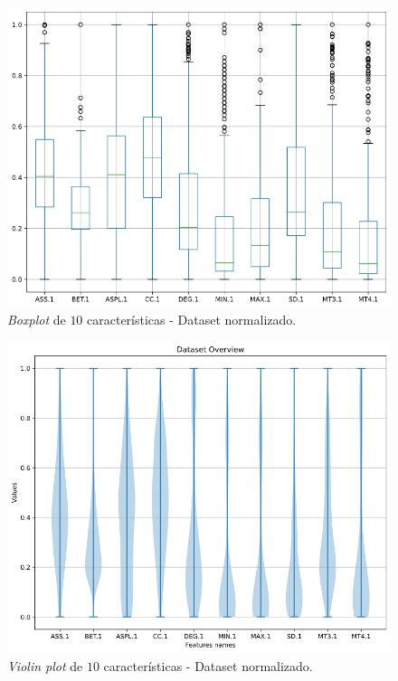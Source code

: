 \documentclass[
	article,			%
	11pt,				%
	oneside,			%
	a4paper,			%
	english,			%
	brazil,				%
	sumario=tradicional
	]{abntex2}
\begin{document}
\newpage
\begin{figure}[H]
 \centering
 \includegraphics[scale=0.4]{fig/boxplot.png}
 \caption{\textit{Boxplot} de $10$ características - Dataset normalizado.}
 \label{fig:boxplot}
\end{figure}

\begin{figure}[H]
 \centering
 \includegraphics[scale=0.4]{fig/violin.png}
 \caption{\textit{Violin plot} de $10$ características - Dataset normalizado.}
 \label{fig:violin}
\end{figure}
\end{document}
